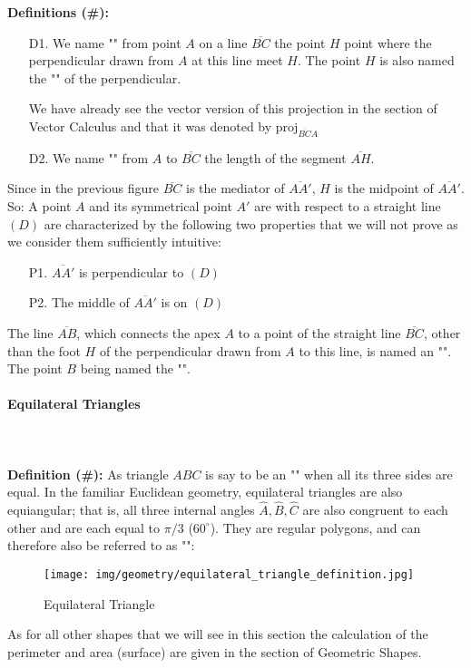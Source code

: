 	\textbf{Definitions (\#\mydef):}
	\begin{enumerate}
		\item[D1.] We name "" from point $A$ on a line $\overline{BC}$ the point $H$ point where the perpendicular drawn from $A$ at this line meet $H$. The  point $H$ is also named the "" of the perpendicular.

		We have already see the vector version of this projection in the section of Vector Calculus and that it was denoted by $\text{proj}_{\overline{BC} A}$

		\item[D2.] We name "" from $A$ to $\overline{BC}$ the length of the segment $\overline{AH}$.
	\end{enumerate}
	Since in the previous figure $\overline{BC}$ is the mediator of $\overline{AA'}$, $H$ is the midpoint of $\overline{AA'}$. So: A point $A$ and its symmetrical point $A'$ are with respect to a straight line $(D)$ are characterized by the following two properties that we will not prove as we consider them sufficiently intuitive:
	\begin{enumerate}
		\item[P1.] $\overline{AA'}$ is perpendicular to $(D)$
		
		\item[P2.]  The middle of $\overline{AA'}$ is on $(D)$
	\end{enumerate}
	The line $\overline{AB}$, which connects the apex $A$ to a point of the straight line $\overline{BC}$, other than the foot $H$ of the perpendicular drawn from $A$ to this line, is named an "". The point $B$ being named the "".
	
	\pagebreak
	\paragraph{Equilateral Triangles}\mbox{}\\\\
	\textbf{Definition (\#\mydef):} As triangle $ABC$ is say to be an "\label{equilateral triangle}" when all its three sides are equal. In the familiar Euclidean geometry, equilateral triangles are also equiangular; that is, all three internal angles $\hat{A},\hat{B},\hat{C}$ are also congruent to each other and are each equal to $\pi/3$ ($60^\circ$). They are regular polygons, and can therefore also be referred to as "":
	\begin{figure}[H]
		\centering
		\texttt{[image: img/geometry/equilateral\_triangle\_definition.jpg]}
		\caption{Equilateral Triangle}
	\end{figure}
	As for all other shapes that we will see in this section the calculation of the perimeter and area (surface) are given in the section of Geometric Shapes.
	
